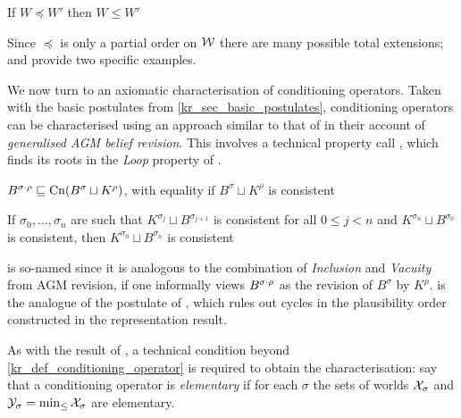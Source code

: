 
\begin{axiom}[\refinement{}]
    If $W \preceq W'$ then $W \le W'$
\end{axiom}

Since $\preceq$ is only a partial order on $\mathcal{W}$ there are many possible total
extensions; \varbasedcond{} and \partbasedcond{} provide two specific examples.

We now turn to an axiomatic characterisation of conditioning operators.
Taken with the basic postulates from \cref{kr_sec_basic_postulates},
conditioning operators can be characterised using an approach similar to that of
\textcite{delgrande2018general} in their account of \emph{generalised AGM belief
revision}.\footnotemark{} This involves a technical property
\citeauthor{delgrande2018general}
call , which finds its roots in the \emph{Loop}
property of \textcite{kraus1990nonmonotonic}.
%

\begin{axiomlist}
\begin{axiom}[\incvac{}]
    $B^{\sigma \cdot \rho} \sqsubseteq \operatorname{Cn}(B^\sigma \sqcup K^\rho)$, with
    equality if $B^\sigma \sqcup K^\rho$ is consistent
\end{axiom}
\begin{axiom}[\acyc{}]
    If $\sigma_0, \ldots, \sigma_n$ are such that $K^{\sigma_j} \sqcup
    B^{\sigma_{j+1}}$ is consistent for all $0 \le j < n$ and $K^{\sigma_n}
    \sqcup B^{\sigma_0}$ is consistent, then $K^{\sigma_0} \sqcup B^{\sigma_n}$
    is consistent
\end{axiom}
\end{axiomlist}

\incvac{} is so-named since it is analogous to the combination of
\emph{Inclusion} and \emph{Vacuity} from AGM revision, if one informally views
$B^{\sigma \cdot \rho}$ as the revision of $B^\sigma$ by $K^\rho$.
%
\acyc{} is the analogue of the postulate of \citeauthor{delgrande2018general},
which rules out cycles in the plausibility order
constructed in the representation result.

As with the result of \citeauthor{delgrande2018general}, a technical condition beyond
\cref{kr_def_conditioning_operator} is required to obtain the characterisation:
say that a conditioning operator is \emph{elementary} if for each $\sigma$ the
sets of worlds $\mathcal{X}_\sigma$ and $\mathcal{Y}_\sigma = \min_{\le}\mathcal{X}_\sigma$ are
elementary.\footnotemark{}
%


